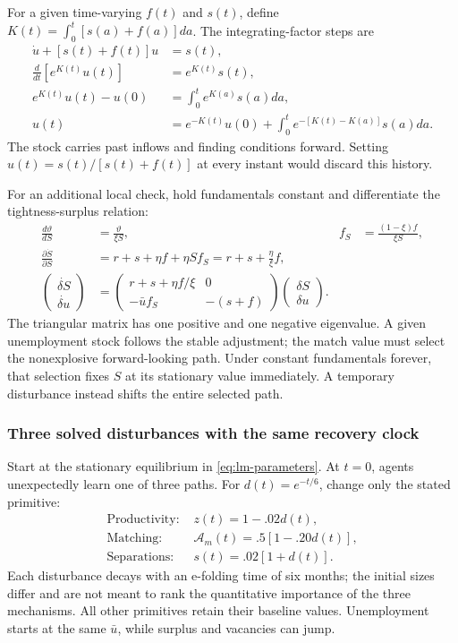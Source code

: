 For a given time-varying $f(t)$ and $s(t)$, define
$K(t)=\int_0^t[s(a)+f(a)]da$. The integrating-factor steps are
\begin{align}
 \dot u+[s(t)+f(t)]u&=s(t),\\
 \frac{d}{dt}[e^{K(t)}u(t)]&=e^{K(t)}s(t),\\
 e^{K(t)}u(t)-u(0)&=\int_0^t e^{K(a)}s(a)da,\\
 u(t)&=e^{-K(t)}u(0)
       +\int_0^t e^{-[K(t)-K(a)]}s(a)da.
 \label{eq:lm-time-varying-u}
\end{align}
The stock carries past inflows and finding conditions forward. Setting
$u(t)=s(t)/[s(t)+f(t)]$ at every instant would discard this history.

For an additional local check, hold fundamentals constant and differentiate
the tightness-surplus relation:
\begin{align}
 \frac{d\vartheta}{dS}&=\frac{\vartheta}{\xi S},
 &f_S&=\frac{(1-\xi)f}{\xi S},\\
 \frac{\partial\dot S}{\partial S}
 &=r+s+\eta f+\eta S f_S
  =r+s+\frac\eta\xi f,\\
 \begin{pmatrix}\dot{\delta S}\\\dot{\delta u}\end{pmatrix}
 &=\begin{pmatrix}
 r+s+\eta f/\xi&0\\-\bar u f_S&-(s+f)
 \end{pmatrix}
 \begin{pmatrix}\delta S\\\delta u\end{pmatrix}.
\end{align}
The triangular matrix has one positive and one negative eigenvalue. A given
unemployment stock follows the stable adjustment; the match value must select
the nonexplosive forward-looking path. Under constant fundamentals forever,
that selection fixes $S$ at its stationary value immediately. A temporary
disturbance instead shifts the entire selected path.

\subsubsection{Three solved disturbances with the same recovery clock}

Start at the stationary equilibrium in \eqref{eq:lm-parameters}. At $t=0$,
agents unexpectedly learn one of three paths. For $d(t)=e^{-t/6}$, change only
the stated primitive:
\begin{align}
 \text{Productivity: }&z(t)=1-.02d(t),\\
 \text{Matching: }&\mathcal A_m(t)=.5[1-.20d(t)],\\
 \text{Separations: }&s(t)=.02[1+d(t)].
\end{align}
Each disturbance decays with an e-folding time of six months; the initial
sizes differ and are not meant to rank the quantitative importance of the
three mechanisms. All other primitives retain their baseline values.
Unemployment starts at the same $\bar u$, while surplus and vacancies can jump.

